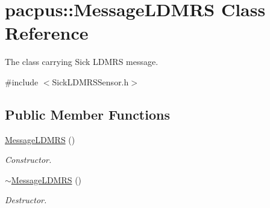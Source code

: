 \hypertarget{classpacpus_1_1MessageLDMRS}{\section{pacpus\-:\-:Message\-L\-D\-M\-R\-S Class Reference}
\label{classpacpus_1_1MessageLDMRS}
}


The class carrying Sick L\-D\-M\-R\-S message.  




{\ttfamily \#include $<$Sick\-L\-D\-M\-R\-S\-Sensor.\-h$>$}

\subsection*{Public Member Functions}
\begin{DoxyCompactItemize}
\item 
\hypertarget{classpacpus_1_1MessageLDMRS_a2f18d36d67deb2c4e77dbc476d68821c}{\hyperlink{classpacpus_1_1MessageLDMRS_a2f18d36d67deb2c4e77dbc476d68821c}{Message\-L\-D\-M\-R\-S} ()}\label{classpacpus_1_1MessageLDMRS_a2f18d36d67deb2c4e77dbc476d68821c}

\begin{DoxyCompactList}\small\item\em Constructor. \end{DoxyCompactList}\item 
\hypertarget{classpacpus_1_1MessageLDMRS_acf5ece71eb2e00750db5e57610eb4a66}{\hyperlink{classpacpus_1_1MessageLDMRS_acf5ece71eb2e00750db5e57610eb4a66}{$\sim$\-Message\-L\-D\-M\-R\-S} ()}\label{classpacpus_1_1MessageLDMRS_acf5ece71eb2e00750db5e57610eb4a66}

\begin{DoxyCompactList}\small\item\em Destructor. \end{DoxyCompactList}\end{DoxyCompactItemize}
